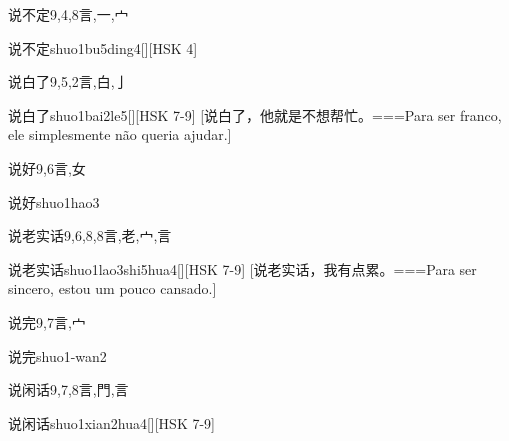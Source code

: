 \begin{Entry}{说不定}{9,4,8}{⾔,⼀,⼧}
  \begin{Phonetics}{说不定}{shuo1bu5ding4}[][HSK 4]
  \end{Phonetics}
\end{Entry}

\begin{Entry}{说白了}{9,5,2}{⾔,⽩,⼅}
  \begin{Phonetics}{说白了}{shuo1bai2le5}[][HSK 7-9]
    [说白了，他就是不想帮忙。===Para ser franco, ele simplesmente não queria ajudar.]
  \end{Phonetics}
\end{Entry}

\begin{Entry}{说好}{9,6}{⾔,⼥}
  \begin{Phonetics}{说好}{shuo1hao3}
  \end{Phonetics}
\end{Entry}

\begin{Entry}{说老实话}{9,6,8,8}{⾔,⽼,⼧,⾔}
  \begin{Phonetics}{说老实话}{shuo1lao3shi5hua4}[][HSK 7-9]
    [说老实话，我有点累。===Para ser sincero, estou um pouco cansado.]
  \end{Phonetics}
\end{Entry}

\begin{Entry}{说完}{9,7}{⾔,⼧}
  \begin{Phonetics}{说完}{shuo1-wan2}
  \end{Phonetics}
\end{Entry}

\begin{Entry}{说闲话}{9,7,8}{⾔,⾨,⾔}
  \begin{Phonetics}{说闲话}{shuo1xian2hua4}[][HSK 7-9]
  \end{Phonetics}
\end{Entry}

